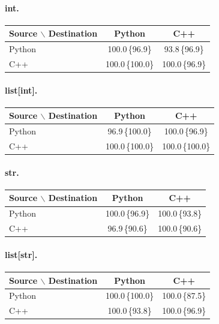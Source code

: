 
\paragraph{int.}
\begin{tabular}{lcc}\toprule
Source $\backslash$ Destination & Python & C++\\\midrule
Python & 100.0\,\{96.9\} & 93.8\,\{96.9\}\\
C++ & 100.0\,\{100.0\} & 100.0\,\{96.9\}\\
\bottomrule\end{tabular}


\paragraph{list[int].}
\begin{tabular}{lcc}\toprule
Source $\backslash$ Destination & Python & C++\\\midrule
Python & 96.9\,\{100.0\} & 100.0\,\{96.9\}\\
C++ & 100.0\,\{100.0\} & 100.0\,\{100.0\}\\
\bottomrule\end{tabular}


\paragraph{str.}
\begin{tabular}{lcc}\toprule
Source $\backslash$ Destination & Python & C++\\\midrule
Python & 100.0\,\{96.9\} & 100.0\,\{93.8\}\\
C++ & 96.9\,\{90.6\} & 100.0\,\{90.6\}\\
\bottomrule\end{tabular}


\paragraph{list[str].}
\begin{tabular}{lcc}\toprule
Source $\backslash$ Destination & Python & C++\\\midrule
Python & 100.0\,\{100.0\} & 100.0\,\{87.5\}\\
C++ & 100.0\,\{93.8\} & 100.0\,\{96.9\}\\
\bottomrule\end{tabular}